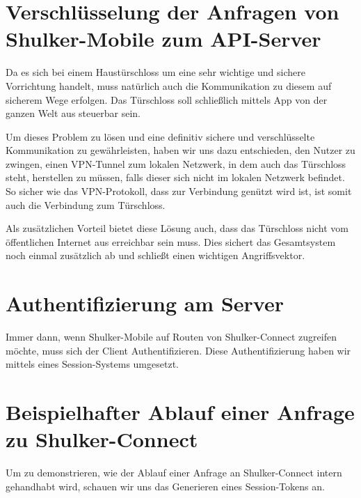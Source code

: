 \section{Verschlüsselung der Anfragen von Shulker-Mobile zum API-Server}
Da es sich bei einem Haustürschloss um eine sehr wichtige und sichere Vorrichtung handelt, muss natürlich auch die
Kommunikation zu diesem auf sicherem Wege erfolgen. Das Türschloss soll schließlich mittels App von der ganzen Welt
aus steuerbar sein.

Um dieses Problem zu lösen und eine definitiv sichere und verschlüsselte Kommunikation zu gewährleisten, haben wir uns dazu 
entschieden, den Nutzer zu zwingen, einen VPN-Tunnel zum lokalen Netzwerk, in dem auch das Türschloss steht, herstellen
zu müssen, falls dieser sich nicht im lokalen Netzwerk befindet. So sicher wie das VPN-Protokoll, dass zur Verbindung genützt
wird ist, ist somit auch die Verbindung zum Türschloss.

Als zusätzlichen Vorteil bietet diese Lösung auch, dass das Türschloss nicht vom öffentlichen Internet aus erreichbar sein muss.
Dies sichert das Gesamtsystem noch einmal zusätzlich ab und schließt einen wichtigen Angriffsvektor.

\section{Authentifizierung am Server}
Immer dann, wenn Shulker-Mobile auf Routen von Shulker-Connect zugreifen möchte, muss sich der Client Authentifizieren.
Diese Authentifizierung haben wir mittels eines Session-Systems umgesetzt.

\section{Beispielhafter Ablauf einer Anfrage zu Shulker-Connect}
Um zu demonstrieren, wie der Ablauf einer Anfrage an Shulker-Connect intern gehandhabt wird, schauen wir uns das Generieren
eines Session-Tokens an.

